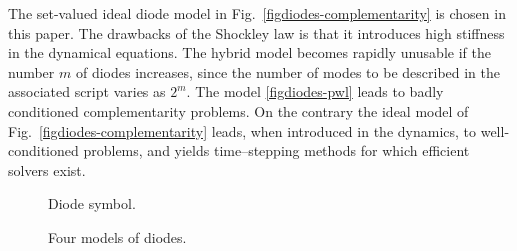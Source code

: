  The set-valued ideal diode model in Fig.~\ref{figdiodes-complementarity} is chosen in this paper. The drawbacks of the Shockley law is that it introduces high stiffness in the dynamical equations. The hybrid model becomes rapidly unusable if the number $m$ of diodes increases, since the number of modes to be described in the associated script varies as $2^{m}$. The model \ref{figdiodes-pwl} leads to badly conditioned complementarity problems. On the contrary the ideal model of Fig.~\ref{figdiodes-complementarity} leads, when introduced in the dynamics, to  well-conditioned problems, and yields time--stepping methods for which efficient solvers exist.
\begin{figure}
  \centering
  
  \caption{Diode symbol.}
  \label{fig:DIODE}
\end{figure}
\begin{figure*}[!ht]
  \hspace{-2mm}
   \hspace{-2mm}
      \caption{Four models of diodes.}
\label{figdiodes}
\end{figure*}
